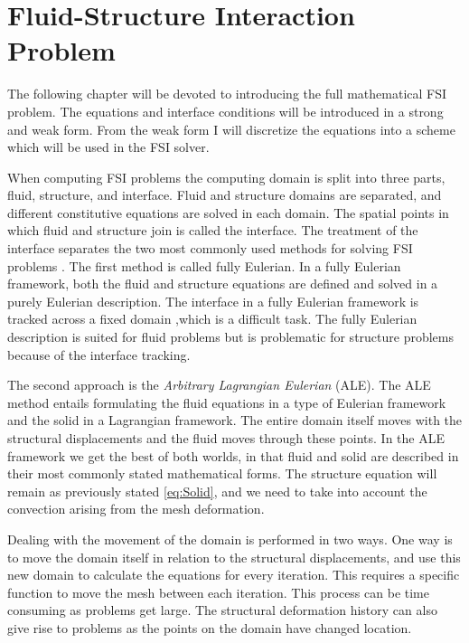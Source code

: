 \chapter{Fluid-Structure Interaction Problem}
The following chapter will be devoted to introducing the full mathematical FSI problem. The equations and interface conditions will be introduced in a strong and weak form. From the weak form I will discretize the equations into a scheme which will be used in the FSI solver. \newline

When computing FSI problems the computing domain is split into three parts, fluid, structure, and interface. Fluid and structure domains are separated, and different constitutive equations are solved in each domain. The spatial points in which fluid and structure join is called the interface. The treatment of the interface separates the two most commonly used methods for solving FSI problems \cite{Liu2014}. The first method is called fully Eulerian. In a fully Eulerian framework, both the fluid and structure equations are defined and solved in a purely Eulerian description. The interface in a fully Eulerian framework is tracked across a fixed domain \cite{Valkov2015},which is a difficult task. The fully Eulerian description is suited for fluid problems but is problematic for structure problems because of the interface tracking. \newline

The second approach is the \textit{Arbitrary Lagrangian Eulerian} (ALE).
The ALE method entails formulating the fluid equations in a type of Eulerian framework and the solid in a Lagrangian framework. The entire domain itself moves with the structural displacements and the fluid moves through these points. In the ALE framework we get the best of both worlds, in that fluid and solid are described in their most commonly stated mathematical forms. The structure equation will remain as previously stated \eqref{eq:Solid}, and we need to take into account the convection arising from the mesh deformation. \newline

Dealing with the movement of the domain is performed in two ways. One way is to move the domain itself in relation to the structural displacements, and use this new domain to calculate the equations for every iteration. This requires a specific function to move the mesh between each iteration. This process can be time consuming as problems get large. The structural deformation history can also give rise to problems as the points on the domain have changed location. \newline

